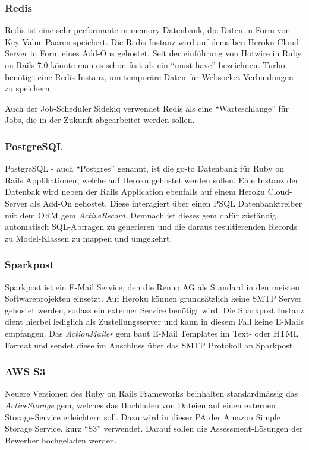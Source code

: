 \subsubsection{Redis}
Redis ist eine sehr performante in-memory Datenbank, die Daten in Form von Key-Value Paaren speichert.
Die Redis-Instanz wird auf demslben Heroku Cloud-Server in Form eines Add-Ons gehostet. Seit der einführung
von Hotwire in Ruby on Rails 7.0 könnte man es schon fast als ein \enquote{must-have} bezeichnen.
Turbo benötigt eine Redis-Instanz, um temporäre Daten für Websocket Verbindungen zu speichern.

Auch der Job-Scheduler Sidekiq verwendet Redis als eine \enquote{Warteschlange} für Jobs, die in der Zukunft
abgearbeitet werden sollen.

\subsubsection{PostgreSQL}
PostgreSQL - auch \enquote{Postgres} genannt, ist die go-to Datenbank für Ruby on Rails Applikationen,
welche auf Heroku gehostet werden sollen. Eine Instanz der Datenbak wird neben der Rails Application ebenfalls auf einem
Heroku Cloud-Server als Add-On gehostet. Diese interagiert über einen PSQL Datenbanktreiber mit dem ORM gem \emph{ActiveRecord}.
Demnach ist dieses gem dafür züständig, automatisch SQL-Abfragen zu generieren und die daraus resultierenden Records zu Model-Klassen zu mappen und umgekehrt.

\subsubsection{Sparkpost}
Sparkpost ist ein E-Mail Service, den die Renuo AG als Standard in den meisten Softwareprojekten einsetzt.
Auf Heroku können grundsätzlich keine SMTP Server gehostet werden, sodass ein externer Service benötigt wird. Die Sparkpost Instanz
dient hierbei lediglich als Zustellungsserver und kann in diesem Fall keine E-Mails empfangen. Das \emph{ActionMailer} gem baut
E-Mail Templates im Text- oder HTML Format und sendet diese im Anschluss über das SMTP Protokoll an Sparkpost.

\subsubsection{AWS S3}
Neuere Versionen des Ruby on Rails Frameworks beinhalten standardmässig das \emph{ActiveStorage} gem, welches das Hochladen von Dateien auf einen
externen Storage-Service erleichtern soll. Dazu wird in dieser PA der Amazon Simple Storage Service, kurz \enquote{S3} verwendet.
Darauf sollen die Assessment-Lösungen der Bewerber hochgeladen werden.

